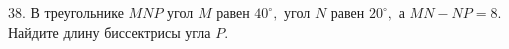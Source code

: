 38. В треугольнике $MNP$ угол $M$ равен $40^\circ,$ угол $N$ равен $20^\circ,$ а $MN-NP=8.$  Найдите длину биссектрисы угла $P.$\\
